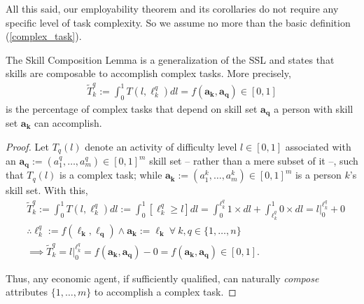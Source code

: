 \documentclass[hidelinks, nonatbib]{elsarticle}
\begin{document}
All this said, our employability theorem and its corollaries do not require any specific level of task complexity. So we assume no more than the basic definition (\ref{complex_task}). 
\begin{lemma}
    \label{scl}
    The Skill Composition Lemma is a generalization of the SSL and states that skills are composable to accomplish complex tasks. More precisely,
    \begin{gather}
        \tilde{T}_{k}^{q}
        :=
        \int_{0}^{1}
        T(l, \ell_{k}^{q})
        dl
        =
        f(\boldsymbol{a_k}, \boldsymbol{a_q})
        \in
        [0,1]
    \end{gather}
    is the percentage of complex tasks that depend on skill set $\boldsymbol{a_q}$ a person with skill set 
    $\boldsymbol{a_k}$ can accomplish.
    \begin{proof}
        Let $T_{q}(l)$ denote an activity of difficulty level $l \in [0,1]$ associated with an $\boldsymbol{a_q} := (a_{1}^{q}, \dots, a_{m}^{q}) \in [0,1]^m$ skill set -- rather than a mere subset of it --, such that $T_{q}(l)$ is a complex task; while $\boldsymbol{a_k} := (a_{1}^{k}, \dots, a_{m}^{k}) \in [0,1]^m$ is a person $k$'s skill set. With this,
        \begin{align}
            &
            \tilde{T}_{k}^{q}
            :=
            \int_{0}^{1}
            T(l, \ell_{k}^{q})
            dl
            :=
            \int_{0}^{1}
            [
                \ell_{k}^{q}
                \geq
                l
            ]
            dl
            =
            \int_{0}^{\ell_{k}^{q}}
            1
            \times
            dl
            +
            \int_{\ell_{k}^{q}}^{1}
            0
            \times
            dl
            =
            l\big|_{0}^{\ell_{k}^{q}}
            + 0
            \\
            &
            \therefore
            \ell_{k}^{q}
            :=
            f(\boldsymbol{\ell_k}, \boldsymbol{\ell_q})
            \land
            \boldsymbol{a_k}
            :=
            \boldsymbol{\ell_k}
            \
            \forall
            \
            k,q \in \{1, \dots, n\}
            \\
            &
            \implies
            \tilde{T}_{k}^{q}
            =
            l\big|_{0}^{\ell_{k}^{q}}
            =
            f(\boldsymbol{a_k}, \boldsymbol{a_q})
            - 0
            =
            f(\boldsymbol{a_k}, \boldsymbol{a_q})
            \in
            [0,1]
            .
        \end{align}
        
        Thus, any economic agent, if sufficiently qualified, can naturally \textit{compose} attributes $\{1, \dots, m\}$ to accomplish a complex task.
    \end{proof}
\end{lemma}
\end{document}
